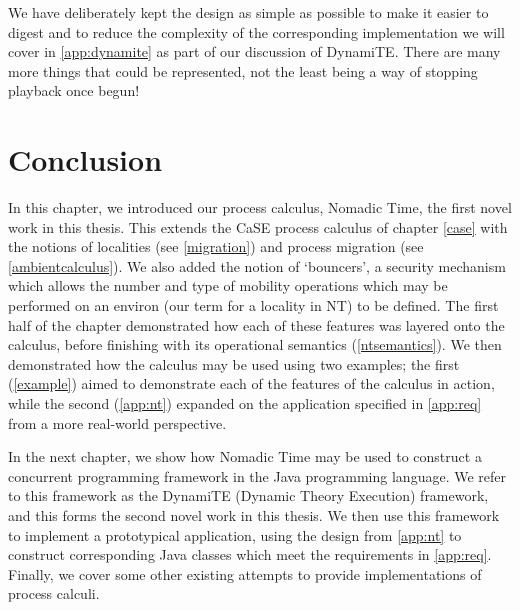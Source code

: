 We have deliberately kept the design as simple as possible to make it
easier to digest and to reduce the complexity of the corresponding
implementation we will cover in \ref{app:dynamite} as part of our
discussion of DynamiTE.  There are many more things that could be
represented, not the least being a way of stopping playback once
begun!

\section{Conclusion}

In this chapter, we introduced our process calculus, Nomadic Time, the
first novel work in this thesis.  This extends the CaSE process
calculus of chapter \ref{case} with the notions of localities (see
\ref{migration}) and process migration (see \ref{ambientcalculus}).
We also added the notion of `bouncers', a security mechanism which
allows the number and type of mobility operations which may be
performed on an environ (our term for a locality in NT) to be defined.
The first half of the chapter demonstrated how each of these features
was layered onto the calculus, before finishing with its operational
semantics (\ref{ntsemantics}).  We then demonstrated how the calculus
may be used using two examples; the first (\ref{example}) aimed to
demonstrate each of the features of the calculus in action, while the
second (\ref{app:nt}) expanded on the application specified in
\ref{app:req} from a more real-world perspective.

In the next chapter, we show how Nomadic Time may be used to construct
a concurrent programming framework in the Java programming language.
We refer to this framework as the DynamiTE (Dynamic Theory Execution)
framework, and this forms the second novel work in this thesis.  We
then use this framework to implement a prototypical application, using
the design from \ref{app:nt} to construct corresponding Java classes
which meet the requirements in \ref{app:req}.  Finally, we cover some
other existing attempts to provide implementations of process calculi.
